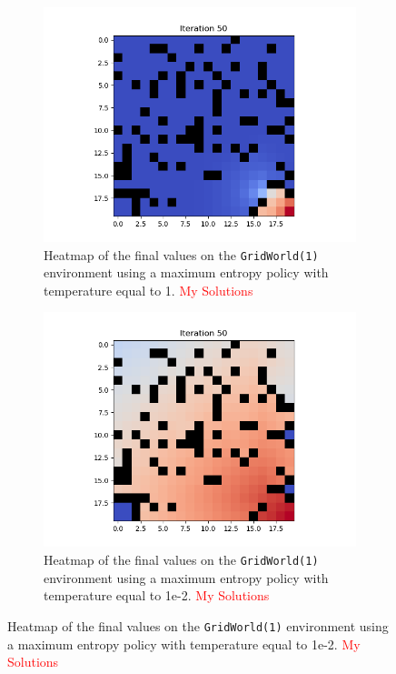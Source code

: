 \documentclass{article}
\begin{document}
\begin{enumerate}[(a)]
\begin{figure}[h!]
    \centering
    \begin{subfigure}{0.3\textwidth}
        \centering
        \includegraphics[width=\textwidth]{figures/part_1_b_t1_naive.png}
        \caption{Heatmap of the final values on the \texttt{GridWorld(1)} environment using a maximum entropy policy with temperature equal to 1.  \textcolor{red}{My Solutions}}
    \end{subfigure}
    \hspace{0.1 in}
    \begin{subfigure}{0.3\textwidth}
        \centering
        \includegraphics[width=\textwidth]{figures/part_1_b_t0-01_naive.png}
        \caption{Heatmap of the final values on the \texttt{GridWorld(1)} environment using a maximum entropy policy with temperature equal to 1e-2.  \textcolor{red}{My Solutions}}

\end{subfigure}
\end{figure}
\end{enumerate}
\end{document}
